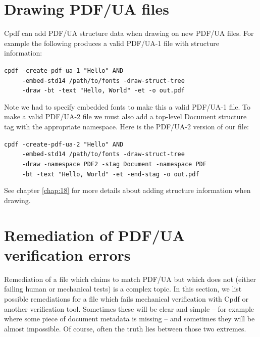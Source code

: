\documentclass{book}
\begin{document}
\section{Drawing PDF/UA files}

Cpdf can add PDF/UA structure data when drawing on new PDF/UA files. For example the following produces a valid PDF/UA-1 file with structure information:

\begin{framed}
   \noindent\small\verb!cpdf -create-pdf-ua-1 "Hello" AND!\\
   \noindent\small\verb!     -embed-std14 /path/to/fonts -draw-struct-tree!\\
   \noindent\small\verb!     -draw -bt -text "Hello, World" -et -o out.pdf!
\end{framed}

\noindent Note we had to specify embedded fonts to make this a valid PDF/UA-1 file. To make a valid PDF/UA-2 file we must also add a top-level Document structure tag with the appropriate namespace. Here is the PDF/UA-2 version of our file:

\begin{framed}
   \noindent\small\verb!cpdf -create-pdf-ua-2 "Hello" AND !\\
   \noindent\small\verb!     -embed-std14 /path/to/fonts -draw-struct-tree!\\
   \noindent\small\verb!     -draw -namespace PDF2 -stag Document -namespace PDF!\\
   \noindent\small\verb!     -bt -text "Hello, World" -et -end-stag -o out.pdf!
\end{framed}

\noindent See chapter \ref{chap:18} for more details about adding structure information when drawing.

\section{Remediation of PDF/UA verification errors}

Remediation of a file which claims to match PDF/UA but which does not (either failing human or mechanical tests) is a complex topic. In this section, we list possible remediations for a file which fails mechanical verification with Cpdf or another verification tool. Sometimes these will be clear and simple -- for example where some piece of document metadata is missing -- and sometimes they will be almost impossible. Of course, often the truth lies between those two extremes.  
\end{document}
